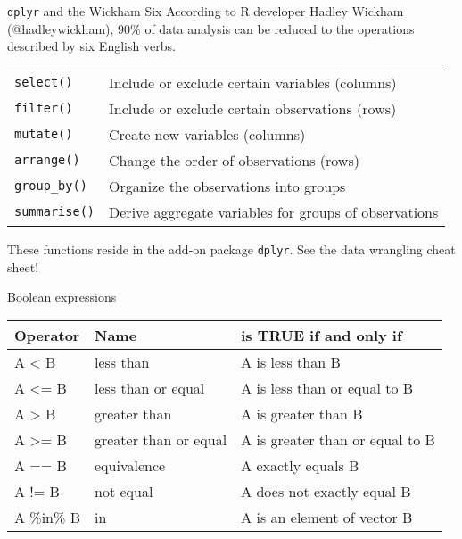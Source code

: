 \documentclass[presentation]{beamer}
\begin{document}
\begin{frame}[fragile,label={sec:org1d34f4b}]{\texttt{dplyr} and the Wickham Six}
 According to R developer Hadley Wickham (@hadleywickham), 90\% of data
analysis can be reduced to the operations described by six English
verbs.

\begin{center}
\begin{tabular}{ll}
\texttt{select()} & Include or exclude certain variables (columns)\\
\texttt{filter()} & Include or exclude certain observations (rows)\\
\texttt{mutate()} & Create new variables (columns)\\
\texttt{arrange()} & Change the order of observations (rows)\\
\texttt{group\_by()} & Organize the observations into groups\\
\texttt{summarise()} & Derive aggregate variables for groups of observations\\
\end{tabular}
\end{center}

These functions reside in the add-on package \texttt{dplyr}.  See the data
wrangling cheat sheet!
\end{frame}

\begin{frame}[label={sec:org2695c8c}]{Boolean expressions}
\begin{small}

\begin{center}
\begin{tabular}{lll}
Operator & Name & is TRUE if and only if\\
\hline
A < B & less than & A is less than B\\
A <= B & less than or equal & A is less than or equal to B\\
A > B & greater than & A is greater than B\\
A >= B & greater than or equal & A is greater than or equal to B\\
A == B & equivalence & A exactly equals B\\
A != B & not equal & A does not exactly equal B\\
A \%in\% B & in & A is an element of vector B\\
\end{tabular}
\end{center}

\end{small}
\end{frame}
\end{document}
